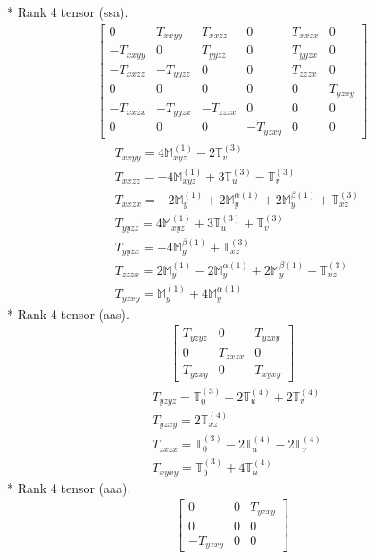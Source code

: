 \documentclass[fleqn,8pt,landscape]{jsarticle}
\begin{document}
* Rank 4 tensor (ssa).
\begin{align*}
\begin{bmatrix} 0 & T_{xxyy} & T_{xxzz} & 0 & T_{xxzx} & 0 \\ - T_{xxyy} & 0 & T_{yyzz} & 0 & T_{yyzx} & 0 \\ - T_{xxzz} & - T_{yyzz} & 0 & 0 & T_{zzzx} & 0 \\ 0 & 0 & 0 & 0 & 0 & T_{yzxy} \\ - T_{xxzx} & - T_{yyzx} & - T_{zzzx} & 0 & 0 & 0 \\ 0 & 0 & 0 & - T_{yzxy} & 0 & 0 \end{bmatrix}
\end{align*}
\begin{align*}
& T_{xxyy} = 4 \mathbb{M}_{xyz}^{(1)} - 2 \mathbb{T}_{v}^{(3)} \\
& T_{xxzz} = - 4 \mathbb{M}_{xyz}^{(1)} + 3 \mathbb{T}_{u}^{(3)} - \mathbb{T}_{v}^{(3)} \\
& T_{xxzx} = - 2 \mathbb{M}_{y}^{(1)} + 2 \mathbb{M}_{y}^{\alpha(1)} + 2 \mathbb{M}_{y}^{\beta(1)} + \mathbb{T}_{xz}^{(3)} \\
& T_{yyzz} = 4 \mathbb{M}_{xyz}^{(1)} + 3 \mathbb{T}_{u}^{(3)} + \mathbb{T}_{v}^{(3)} \\
& T_{yyzx} = - 4 \mathbb{M}_{y}^{\beta(1)} + \mathbb{T}_{xz}^{(3)} \\
& T_{zzzx} = 2 \mathbb{M}_{y}^{(1)} - 2 \mathbb{M}_{y}^{\alpha(1)} + 2 \mathbb{M}_{y}^{\beta(1)} + \mathbb{T}_{xz}^{(3)} \\
& T_{yzxy} = \mathbb{M}_{y}^{(1)} + 4 \mathbb{M}_{y}^{\alpha(1)}
\end{align*}
* Rank 4 tensor (aas).
\begin{align*}
\begin{bmatrix} T_{yzyz} & 0 & T_{yzxy} \\ 0 & T_{zxzx} & 0 \\ T_{yzxy} & 0 & T_{xyxy} \end{bmatrix}
\end{align*}
\begin{align*}
& T_{yzyz} = \mathbb{T}_{0}^{(3)} - 2 \mathbb{T}_{u}^{(4)} + 2 \mathbb{T}_{v}^{(4)} \\
& T_{yzxy} = 2 \mathbb{T}_{xz}^{(4)} \\
& T_{zxzx} = \mathbb{T}_{0}^{(3)} - 2 \mathbb{T}_{u}^{(4)} - 2 \mathbb{T}_{v}^{(4)} \\
& T_{xyxy} = \mathbb{T}_{0}^{(3)} + 4 \mathbb{T}_{u}^{(4)}
\end{align*}
* Rank 4 tensor (aaa).
\begin{align*}
\begin{bmatrix} 0 & 0 & T_{yzxy} \\ 0 & 0 & 0 \\ - T_{yzxy} & 0 & 0 \end{bmatrix}
\end{align*}
\end{document}
